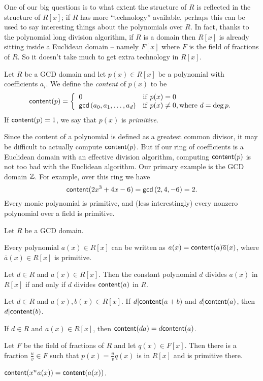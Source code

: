 One of our big questions is to what extent the structure of \(R\) is reflected in the structure of \(R[x]\); if \(R\) has more ``technology'' available, perhaps this can be used to say interesting things about the polynomials over \(R\).
In fact, thanks to the polynomial long division algorithm, if \(R\) is a domain then \(R[x]\) is already sitting inside a Euclidean domain -- namely \(F[x]\) where \(F\) is the field of fractions of \(R\).
So it doesn't take much to get extra technology in \(R[x]\).

\begin{dfn} \label{dfn:poly-content}
Let \(R\) be a GCD domain and let \(p(x) \in R[x]\) be a polynomial with coefficients \(a_i\).
We define the \emph{content} of \(p(x)\) to be \[ \mathsf{content}(p) = \left\{ \begin{array}{ll} 0 & \mathrm{if}\ p(x) = 0 \\ \mathsf{gcd}\left(a_0,a_1,\ldots,a_d\right) & \mathrm{if}\ p(x) \neq 0, \mathrm{where}\ d = \deg{p}. \end{array} \right. \] If \(\mathsf{content}(p) = 1\), we say that \(p(x)\) is \emph{primitive}.
\end{dfn}

Since the content of a polynomial is defined as a greatest common divisor, it may be difficult to actually compute \(\mathsf{content}(p)\).
But if our ring of coefficients is a Euclidean domain with an effective division algorithm, computing \(\mathsf{content}(p)\) is not too bad with the Euclidean algorithm.
Our primary example is the GCD domain \(\mathbb{Z}\).
For example, over this ring we have \[ \mathsf{content}(2x^3 + 4x - 6) = \mathsf{gcd}\left(2,4,-6\right) = 2. \] Every monic polynomial is primitive, and (less interestingly) every nonzero polynomial over a field is primitive.

\begin{prop} \label{prop:content-basics}
Let \(R\) be a GCD domain.
\begin{proplist}
\item Every polynomial \(a(x) \in R[x]\) can be written as \(a(x) = \mathsf{content}(a) \overline{a}(x)\), where \(\overline{a}(x) \in R[x]\) is primitive.
\item Let \(d \in R\) and \(a(x) \in R[x]\).
Then the constant polynomial \(d\) divides \(a(x)\) in \(R[x]\) if and only if \(d\) divides \(\mathsf{content}(a)\) in \(R\).
\item Let \(d \in R\) and \(a(x), b(x) \in R[x]\).
If \(d|\mathsf{content}(a+b)\) and \(d|\mathsf{content}(a)\), then \(d|\mathsf{content}(b)\).
\item If \(d \in R\) and \(a(x) \in R[x]\), then \(\mathsf{content}(da) = d\mathsf{content}(a)\).
\item Let \(F\) be the field of fractions of \(R\) and let \(q(x) \in F[x]\).
Then there is a fraction \(\frac{u}{v} \in F\) such that \(p(x) = \frac{u}{v}q(x)\) is in \(R[x]\) and is primitive there.
\item \(\mathsf{content}(x^n a(x)) = \mathsf{content}(a(x))\).
\end{proplist}
\end{prop}

